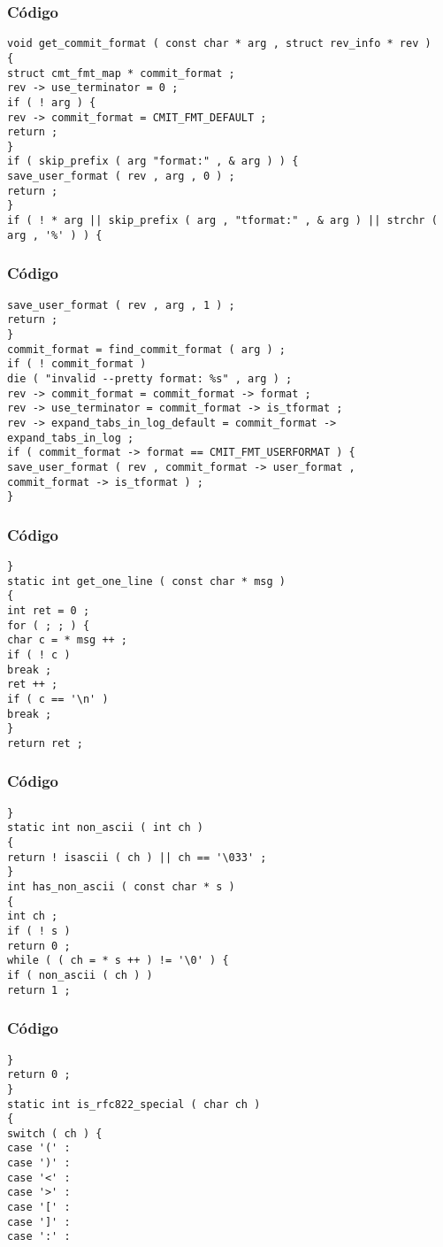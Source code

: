 \documentclass{beamer}
\begin{document}
\begin{frame}[fragile]
\frametitle{C\'odigo}
\begin{verbatim}
void get_commit_format ( const char * arg , struct rev_info * rev ) 
{ 
struct cmt_fmt_map * commit_format ; 
rev -> use_terminator = 0 ; 
if ( ! arg ) { 
rev -> commit_format = CMIT_FMT_DEFAULT ; 
return ; 
} 
if ( skip_prefix ( arg "format:" , & arg ) ) { 
save_user_format ( rev , arg , 0 ) ; 
return ; 
} 
if ( ! * arg || skip_prefix ( arg , "tformat:" , & arg ) || strchr ( arg , '%' ) ) { 
\end{verbatim}
\end{frame}
\begin{frame}[fragile]
\frametitle{C\'odigo}
\begin{verbatim}
save_user_format ( rev , arg , 1 ) ; 
return ; 
} 
commit_format = find_commit_format ( arg ) ; 
if ( ! commit_format ) 
die ( "invalid --pretty format: %s" , arg ) ; 
rev -> commit_format = commit_format -> format ; 
rev -> use_terminator = commit_format -> is_tformat ; 
rev -> expand_tabs_in_log_default = commit_format -> expand_tabs_in_log ; 
if ( commit_format -> format == CMIT_FMT_USERFORMAT ) { 
save_user_format ( rev , commit_format -> user_format , 
commit_format -> is_tformat ) ; 
} 
\end{verbatim}
\end{frame}
\begin{frame}[fragile]
\frametitle{C\'odigo}
\begin{verbatim}
} 
static int get_one_line ( const char * msg ) 
{ 
int ret = 0 ; 
for ( ; ; ) { 
char c = * msg ++ ; 
if ( ! c ) 
break ; 
ret ++ ; 
if ( c == '\n' ) 
break ; 
} 
return ret ; 
\end{verbatim}
\end{frame}
\begin{frame}[fragile]
\frametitle{C\'odigo}
\begin{verbatim}
} 
static int non_ascii ( int ch ) 
{ 
return ! isascii ( ch ) || ch == '\033' ; 
} 
int has_non_ascii ( const char * s ) 
{ 
int ch ; 
if ( ! s ) 
return 0 ; 
while ( ( ch = * s ++ ) != '\0' ) { 
if ( non_ascii ( ch ) ) 
return 1 ; 
\end{verbatim}
\end{frame}
\begin{frame}[fragile]
\frametitle{C\'odigo}
\begin{verbatim}
} 
return 0 ; 
} 
static int is_rfc822_special ( char ch ) 
{ 
switch ( ch ) { 
case '(' : 
case ')' : 
case '<' : 
case '>' : 
case '[' : 
case ']' : 
case ':' : 
\end{verbatim}
\end{frame}
\end{document}

